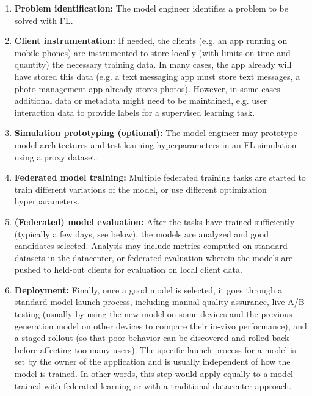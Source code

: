 \documentclass[11pt]{article}
\begin{document}
\begin{enumerate}

\item \textbf{Problem identification:} The model engineer identifies a problem to be solved with FL.

\item \textbf{Client instrumentation:} If needed, the clients (e.g. an app running on mobile phones) are instrumented to store locally (with limits on time and quantity) the necessary training data. In many cases, the app already will have stored this data (e.g. a text messaging app must store text messages, a photo management app already stores photos). However, in some cases additional data or metadata might need to be maintained, e.g. user interaction data to provide labels for a supervised learning task.

\item \textbf{Simulation prototyping (optional):} The model engineer may prototype model architectures and test learning hyperparameters in an FL simulation using a proxy dataset.

\item \textbf{Federated model training: } Multiple federated training tasks are started to train different variations of the model, or use different optimization hyperparameters. \label{step:fl-train}

\item \textbf{ (Federated) model evaluation:} After the tasks have trained sufficiently (typically a few days, see below), the models are analyzed and good candidates selected. Analysis may include metrics computed on standard datasets in the datacenter, or federated evaluation wherein the models are pushed to held-out clients for evaluation on local client data.

\item \textbf{Deployment:} Finally, once a good model is selected, it goes through a standard model launch process, including manual quality assurance, live A/B testing (usually by using the new model on some devices and the previous generation model on other devices to compare their in-vivo performance), and a staged rollout (so that poor behavior can be discovered and rolled back before affecting too many users). The specific launch process for a model is set by the owner of the application and is usually independent of how the model is trained. In other words, this step would apply equally to a model trained with federated learning or with a traditional datacenter approach.\label{step:deploy}

\end{enumerate}
\end{document}
